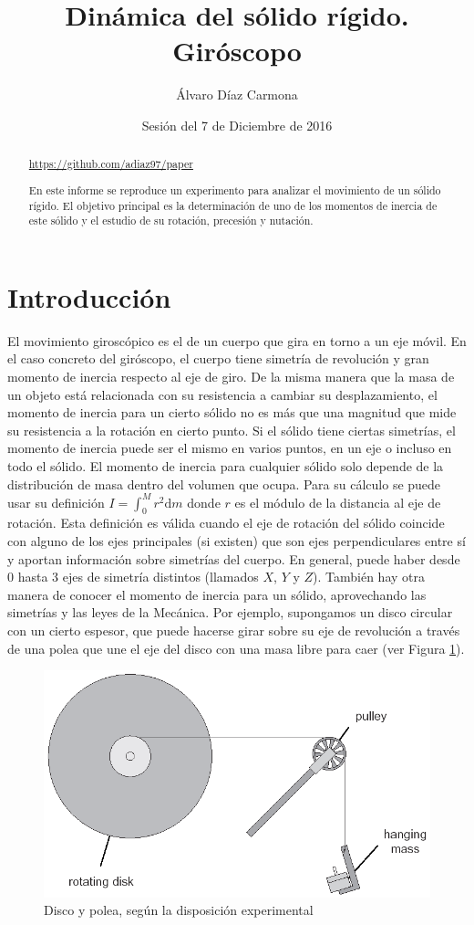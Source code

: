 \documentclass[a4paper]{article}
\begin{document}
\title{Dinámica del sólido rígido. Giróscopo}
\author{Álvaro Díaz Carmona}
\date{Sesión del 7 de Diciembre de 2016}
\maketitle
\begin{abstract}
\url{https://github.com/adiaz97/paper}

En este informe se reproduce un experimento para analizar el movimiento de un sólido rígido. El objetivo principal es la determinación de uno de los momentos de inercia de este sólido y el estudio de su rotación, precesión y nutación.

\end{abstract}

\section{Introducción}
El movimiento giroscópico es el de un cuerpo que gira en torno a un eje móvil. En el caso concreto del giróscopo, el cuerpo tiene simetría de revolución y gran momento de inercia respecto al eje de giro. 
De la misma manera que la masa de un objeto está relacionada con su resistencia a cambiar su desplazamiento, el momento de inercia para un cierto sólido no es más que una magnitud que mide su resistencia a la rotación en cierto punto. Si el sólido tiene ciertas simetrías, el momento de inercia puede ser el mismo en varios puntos, en un eje o incluso en todo el sólido. El momento de inercia para cualquier sólido solo depende de la distribución de masa dentro del volumen que ocupa. Para su cálculo se puede usar su definición $I=\int^{M}_{0} r^2\mathrm{d}m$ donde $r$ es el módulo de la distancia al eje de rotación. Esta definición es válida cuando el eje de rotación del sólido coincide con alguno de los ejes principales (si existen) que son ejes perpendiculares entre sí y aportan información sobre simetrías del cuerpo. En general, puede haber desde 0 hasta 3 ejes de simetría distintos (llamados $X$, $Y$ y $Z$). 
También hay otra manera de conocer el momento de inercia para un sólido, aprovechando las simetrías y las leyes de la Mecánica. Por ejemplo, supongamos un disco circular con un cierto espesor, que puede hacerse girar sobre su eje de revolución a través de una polea que une el eje del disco con una masa libre para caer (ver Figura \ref{disco1}).
\begin{figure}[H]
\begin{center}
\includegraphics[width=10 cm]{disco1.png}
\caption{Disco y polea, según la disposición experimental}
\label{disco1}
\end{center}
\end{figure}
\end{document}
